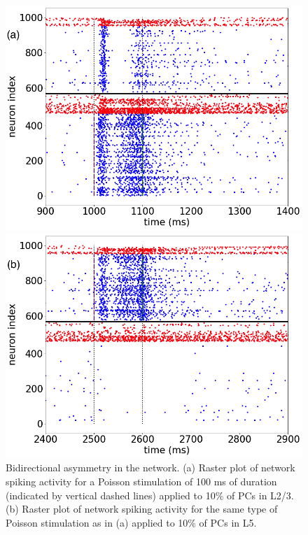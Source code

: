 \begin{figure}[H]
    \begin{minipage}[b]{0.45\textwidth}
    \centering
    \includegraphics[scale=0.23]{poisson1a.png}
    \end{minipage}
    \hfill
    \begin{minipage}[b]{0.5\textwidth}
    \centering
    \includegraphics[scale=0.23]{poisson2b.png}
    \end{minipage}
    \caption{Bidirectional asymmetry in the network. (a) Raster plot of network spiking activity for a Poisson stimulation of 100 ms of duration (indicated by vertical dashed lines) applied to 10\% of PCs in L2/3. (b) Raster plot of network spiking activity for the same type of Poisson stimulation as in (a) applied to 10\% of PCs in L5.}
    \label{fig:Poisson1}
\end{figure}

